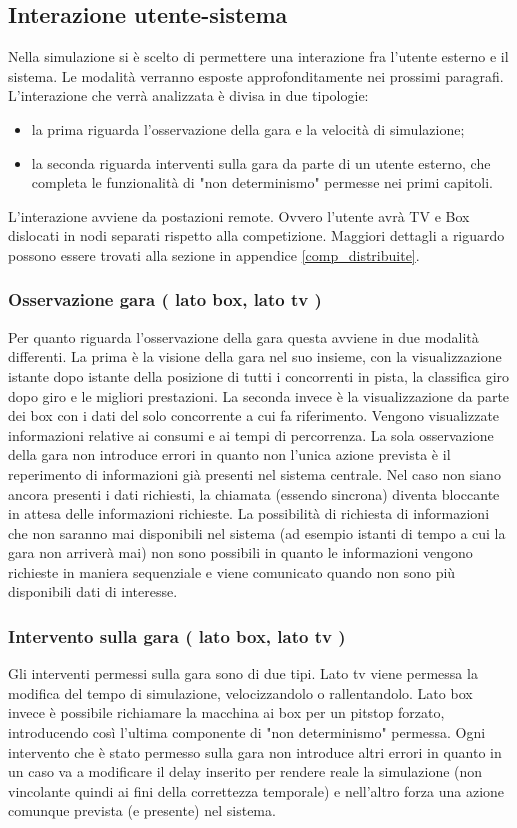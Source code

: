 \subsection{Interazione utente-sistema}
Nella simulazione si è scelto di permettere una interazione fra l'utente esterno
e il sistema. Le modalità verranno esposte approfonditamente nei prossimi
paragrafi. L'interazione che verrà analizzata è divisa in due tipologie:
\begin{itemize}
\item la
prima riguarda l'osservazione della gara e la velocità di simulazione;
\item la
seconda  riguarda interventi sulla gara da parte di un utente esterno,
che completa le funzionalità di "non determinismo" permesse nei primi capitoli.
\end{itemize}
L'interazione avviene da postazioni remote. Ovvero l'utente avrà TV e Box dislocati in nodi separati 
rispetto alla competizione. Maggiori dettagli a riguardo possono essere trovati alla sezione in appendice
\ref{comp_distribuite}.
\subsubsection{Osservazione gara ( lato box, lato tv )}
Per quanto riguarda l'osservazione della gara questa avviene in due modalità
differenti. La prima è la visione della gara nel suo insieme, con la
visualizzazione istante dopo istante della posizione di tutti i concorrenti in
pista, la classifica giro dopo giro e le migliori prestazioni. La seconda invece
è la visualizzazione da parte dei box con i dati del solo concorrente a cui fa
riferimento. Vengono visualizzate informazioni relative ai consumi e ai tempi di
percorrenza. La sola osservazione della gara non introduce errori in quanto non
l'unica azione prevista è il reperimento di informazioni già presenti nel
sistema centrale. Nel caso non siano ancora presenti i dati richiesti, la
chiamata (essendo sincrona) diventa bloccante in attesa delle informazioni
richieste. La possibilità di richiesta di informazioni che non saranno mai
disponibili nel sistema (ad esempio istanti di tempo a cui la gara non arriverà
mai) non sono possibili in quanto le informazioni vengono richieste in
maniera sequenziale e viene comunicato quando non sono più disponibili dati di
interesse.
\subsubsection{Intervento sulla gara ( lato box, lato tv )}
Gli interventi permessi sulla gara sono di due tipi. Lato tv
viene permessa la modifica del tempo di simulazione, velocizzandolo o
rallentandolo. Lato box invece è possibile richiamare la macchina ai box per un
pitstop forzato, introducendo così l'ultima componente di "non determinismo"
permessa.
Ogni intervento che è stato permesso sulla gara non introduce altri errori in
quanto in un caso va a modificare il delay inserito per rendere reale la
simulazione (non vincolante quindi ai fini della correttezza temporale)
e nell'altro forza una azione comunque prevista (e presente) nel
sistema. 
